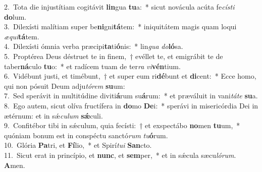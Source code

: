 {2.~}Tota die injustítiam cogitávit \textbf{lin}gua \textbf{tu}a:~* sicut novácula acúta fe\textit{cí}\textit{sti} \textbf{do}lum.\\
{3.~}Dilexísti malítiam super be\textbf{ni}gni\textbf{tá}tem:~* iniquitátem magis quam loqui \textit{æ}\textit{qui}\textbf{tá}tem.\\
{4.~}Dilexísti ómnia verba præcipi\textbf{ta}ti\textbf{ó}nis:~* lin\textit{gua} \textit{do}\textbf{ló}sa.\\
{5.~}Proptérea Deus déstruet te in finem,~† evéllet te, et emigrábit te de taber\textbf{ná}culo \textbf{tu}o:~* et radícem tuam de ter\textit{ra} \textit{vi}\textbf{vén}tium.\\
{6.~}Vidébunt justi, et timébunt,~† et super eum ri\textbf{dé}bunt et \textbf{di}cent:~* Ecce homo, qui non pósuit Deum adju\textit{tó}\textit{rem} \textbf{su}um:\\
{7.~}Sed sperávit in multitúdine diviti\textbf{á}rum su\textbf{á}rum:~* et præváluit in vani\textit{tá}\textit{te} \textbf{su}a.\\
{8.~}Ego autem, sicut olíva fructífera in \textbf{do}mo \textbf{De}i:~* sperávi in misericórdia Dei in ætérnum: et in sǽ\textit{cu}\textit{lum} \textbf{sǽ}culi.\\
{9.~}Confitébor tibi in sǽculum, quia fecísti:~† et exspectábo \textbf{no}men \textbf{tu}um,~* quóniam bonum est in conspéctu sanctó\textit{rum} \textit{tu}\textbf{ó}rum.\\
{10.~}Glória \textbf{Pa}tri, et \textbf{Fí}lio,~* et Spirí\textit{tu}\textit{i} \textbf{San}cto.\\
{11.~}Sicut erat in princípio, et \textbf{nunc}, et \textbf{sem}per,~* et in sǽcula sæcu\textit{ló}\textit{rum}. \textbf{A}men.\\
